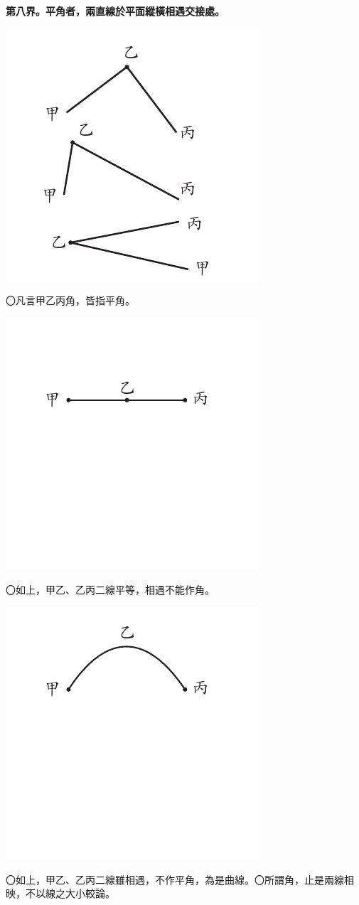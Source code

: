 \documentclass[12pt,b5paper,landscape]{article}
\newcommand{\bcom}[1]{〇#1}
\newcommand{\cthm}[1]{{
\vspace{8pt}

\bfseries #1}}
\begin{document}
\begin{multicols}{2}
\cthm{第八界。平角者，兩直線於平面縱橫相遇交接處。}
\begin{center}
\includegraphics[angle=90]{eu6}
\end{center}
\bcom{凡言甲乙丙角，皆指平角。}
\begin{center}
\includegraphics[angle=90]{eu7}
\end{center}
\bcom{如上，甲乙、乙丙二線平等，相遇不能作角。}
\begin{center}
\includegraphics[angle=90]{eu8}
\end{center}
\bcom{如上，甲乙、乙丙二線雖相遇，不作平角，為是曲線。}\bcom{所謂角，止是兩線相映，不以線之大小較論。}


\end{multicols}
\end{document}
